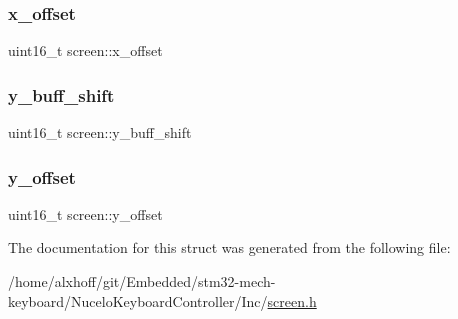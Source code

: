 \mbox{\label{structscreen_a081157d1078058d38d2acdbeb48673a7}} 
\subsubsection{\texorpdfstring{x\+\_\+offset}{x\_offset}}
{\footnotesize\ttfamily uint16\+\_\+t screen\+::x\+\_\+offset}

\mbox{\label{structscreen_a834452f927fb3ac5cd361ec2d1f73ca9}} 
\subsubsection{\texorpdfstring{y\+\_\+buff\+\_\+shift}{y\_buff\_shift}}
{\footnotesize\ttfamily uint16\+\_\+t screen\+::y\+\_\+buff\+\_\+shift}

\mbox{\label{structscreen_af267e885854662d4da48e2477de499a3}} 
\subsubsection{\texorpdfstring{y\+\_\+offset}{y\_offset}}
{\footnotesize\ttfamily uint16\+\_\+t screen\+::y\+\_\+offset}



The documentation for this struct was generated from the following file\+:\begin{DoxyCompactItemize}
\item 
/home/alxhoff/git/\+Embedded/stm32-\/mech-\/keyboard/\+Nucelo\+Keyboard\+Controller/\+Inc/\hyperlink{screen_8h}{screen.\+h}\end{DoxyCompactItemize}
